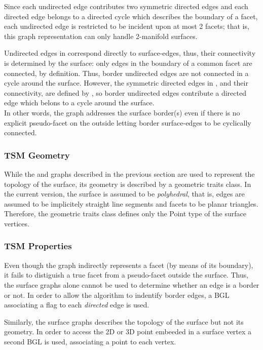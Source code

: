 Since each undirected edge contributes two symmetric directed edges and each directed edge belongs to a directed cycle which describes the boundary of a facet, each undirected edge is restricted to be incident upon at most 2 facets; that is, this graph representation can only handle 2-manifold surfaces. 

Undirected edges in  correspond directly to surface-edges, thus, their connectivity is determined by the surface: only edges in the boundary of a common facet are connected, by definition. Thus, border undirected edges are not connected in a cycle around the surface. However, the symmetric directed edges in , and their connectivity, are defined by , so border undirected edges contribute a directed edge which belons to a cycle around the surface.\\
In other words, the  graph addresses the surface border(s) even if there is no explicit pseudo-facet on the outside letting border surface-edges to be cyclically connected.

\subsubsection{TSM Geometry}

While the  and  graphs described in the previous section are used to represent the topology of the surface, its geometry is described by a geometric traits class. In the current version, the surface is assumed to be {\em polyhedral}, that is, edges are assumed to be implicitely straight line segments and facets to be planar triangles. Therefore, the geometric traits class defines only the Point type of the surface vertices.

\subsubsection{TSM Properties}

Even though the  graph indirectly represents a facet (by means of its boundary), it fails to distiguish a true facet from a pseudo-facet outside the surface. Thus, the surface graphs alone cannot be used to determine whether an edge is a border or not. In order to allow the algorithm to indentify border edges, a BGL  associating a  flag to each {\em directed} edge is used.

Similarly, the surface graphs describes the topology of the surface but not its geometry. In order to access the 2D or 3D point embeeded in a surface vertex a second BGL  is used, associating a point to each vertex.

